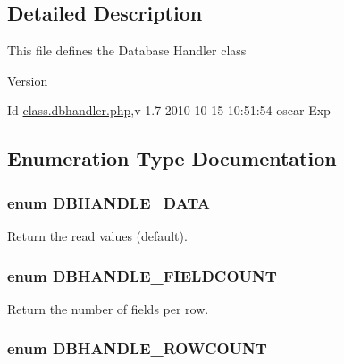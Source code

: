 \subsection{Detailed Description}
This file defines the Database Handler class \begin{DoxyVersion}{Version}

\end{DoxyVersion}
\begin{DoxyParagraph}{Id}
\hyperlink{class_8dbhandler_8php}{class.dbhandler.php},v 1.7 2010-\/10-\/15 10:51:54 oscar Exp 
\end{DoxyParagraph}


\subsection{Enumeration Type Documentation}
\subsubsection[{DBHANDLE\_\-DATA}]{\setlength{\rightskip}{0pt plus 5cm}enum {\bf DBHANDLE\_\-DATA}}\label{class_8dbhandler_8php_acc5178c2a582eafa4ef488ed3394b725}


Return the read values (default). 

\subsubsection[{DBHANDLE\_\-FIELDCOUNT}]{\setlength{\rightskip}{0pt plus 5cm}enum {\bf DBHANDLE\_\-FIELDCOUNT}}\label{class_8dbhandler_8php_afda554c4527b03446f287291626c12ad}


Return the number of fields per row. 

\subsubsection[{DBHANDLE\_\-ROWCOUNT}]{\setlength{\rightskip}{0pt plus 5cm}enum {\bf DBHANDLE\_\-ROWCOUNT}}\label{class_8dbhandler_8php_ac904f05455a162c07c216c330ad7c5c6}


